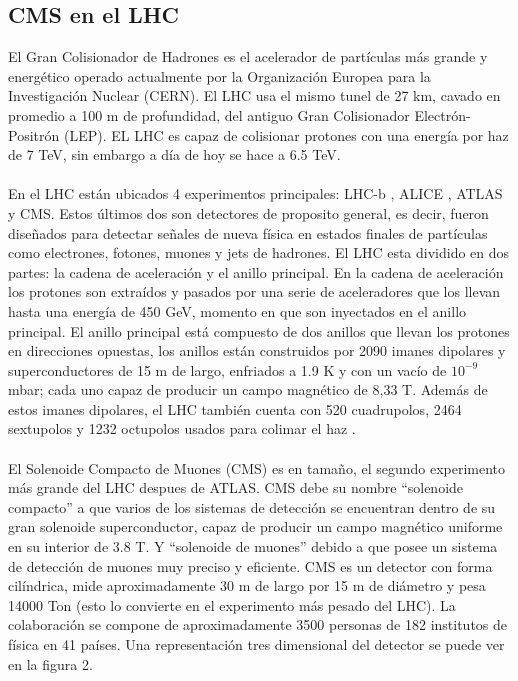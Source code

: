 \label{sec:examples}

\subsection{CMS en el LHC}
El Gran Colisionador de Hadrones es el acelerador de partículas más grande y energético operado actualmente por la Organización Europea para la Investigación Nuclear (CERN). El LHC usa el mismo tunel de 27 km, cavado en promedio a 100 m de profundidad, del antiguo Gran Colisionador Electrón-Positrón (LEP). EL LHC es capaz de colisionar protones con una energía por haz de 7 TeV, sin embargo a día de hoy se hace a 6.5 TeV.
\\
\\
En el LHC están ubicados 4 experimentos principales: LHC-b \cite{Alves:2008zz}, ALICE \cite{Aamodt:2008zz}, ATLAS \cite{Aad:2008zzm} y CMS. Estos últimos dos son detectores de proposito general, es decir, fueron diseñados para detectar señales de nueva física en estados finales de partículas como electrones, fotones, muones y jets de hadrones. El LHC esta dividido en dos partes: la cadena de aceleración y el anillo principal. En la cadena de aceleración los protones son extraídos y pasados por una serie de aceleradores que los llevan hasta una energía de 450 GeV, momento en que son inyectados en el anillo principal. El anillo principal está compuesto de dos anillos que llevan los protones en direcciones opuestas, los anillos están construidos por 2090 imanes dipolares y superconductores de 15 m de largo, enfriados a 1.9 K y con un vacío de $10^{-9}$mbar; cada uno capaz de producir un campo magnético de 8,33 T. Además de estos imanes dipolares, el LHC también cuenta con 520 cuadrupolos, 2464 sextupolos y 1232 octupolos usados para colimar el haz \cite{RuizAlvarez:2016mhn}. 
\\
\\
El Solenoide Compacto de Muones (CMS) es en tamaño, el segundo experimento más grande del LHC despues de ATLAS. CMS debe su nombre ``solenoide compacto'' a que varios de los sistemas de detección se encuentran dentro de su gran solenoide superconductor, capaz de producir un campo magnético uniforme en su interior de 3.8 T. Y ``solenoide de muones'' debido a que posee un sistema de detección de muones muy preciso y eficiente. CMS es un detector con forma cilíndrica, mide aproximadamente 30 m de largo por 15 m de diámetro y pesa 14000 Ton (esto lo convierte en el experimento más pesado del LHC). La colaboración se compone de aproximadamente 3500 personas de 182 institutos de física en 41 países. Una representación tres dimensional del detector se puede ver en la figura 2.
